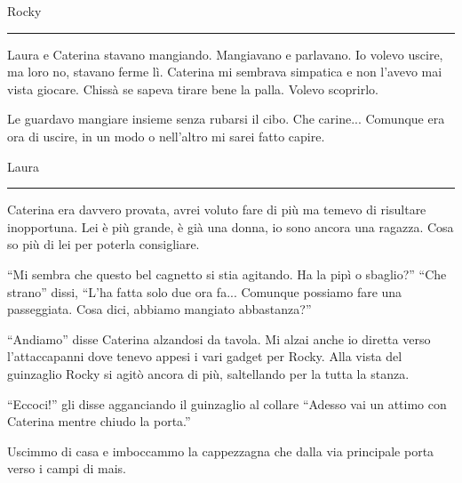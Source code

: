 \vspace{1em}
\begin{center}Rocky\end{center}
\hrule
\vspace{1em}
Laura e Caterina stavano mangiando. Mangiavano e parlavano. Io volevo uscire, ma loro no, stavano ferme lì. Caterina mi sembrava simpatica e  non l’avevo mai vista giocare. Chissà se sapeva tirare bene la palla. Volevo scoprirlo.  

Le guardavo mangiare insieme senza rubarsi il cibo. Che carine...
Comunque era ora di uscire, in un modo o nell'altro mi sarei fatto capire.

\vspace{1em}
\begin{center}Laura\end{center}
\hrule
\vspace{1em}
Caterina era davvero provata, avrei voluto fare di più ma temevo di risultare inopportuna. Lei è più grande, è già una donna, io sono ancora una ragazza. Cosa  so più di lei per poterla consigliare.
\begin{dialogue}
  \enquote{Mi sembra che questo bel cagnetto si stia agitando. Ha la pipì o sbaglio?}
 \enquote{Che strano} dissi, \enquote{L'ha fatta solo due ora fa... Comunque possiamo  fare una passeggiata. Cosa dici, abbiamo mangiato abbastanza?}

\end{dialogue}
\enquote{Andiamo} disse Caterina alzandosi da tavola. Mi alzai anche io  diretta verso l'attaccapanni dove tenevo appesi i vari gadget per Rocky.
Alla vista del guinzaglio Rocky si agitò ancora di più, saltellando per la tutta la stanza.

\begin{dialogue}
 \enquote{Eccoci!} gli disse agganciando il guinzaglio al collare \enquote{Adesso vai un attimo con Caterina mentre chiudo la porta.}
\end{dialogue}

Uscimmo di casa e imboccammo la cappezzagna che dalla via principale porta verso i campi di mais.

